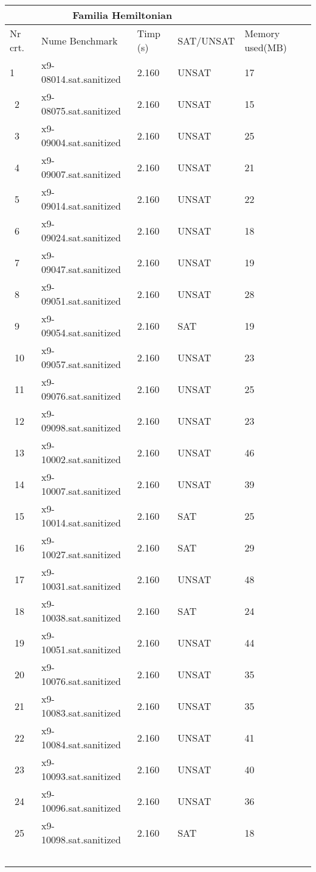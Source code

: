 \documentclass[12pt,a4paper]{report}
\begin{document}
\begin{tabular}{ |p{1cm}||p{4cm}|p{3cm}|p{3cm}|p{3cm}|  }
 \hline
 \multicolumn{4}{|c|}{Familia Hemiltonian} \\
 \hline
 Nr crt.& Nume Benchmark & Timp (s)& SAT/UNSAT & Memory used(MB)\\
 \hline

1 & x9-08014.sat.sanitized &2.160& UNSAT & 17\\\  
2 & x9-08075.sat.sanitized &2.160& UNSAT & 15\\\  
3 & x9-09004.sat.sanitized &2.160& UNSAT & 25\\\  
4 & x9-09007.sat.sanitized &2.160& UNSAT & 21\\\  
5 & x9-09014.sat.sanitized &2.160& UNSAT & 22\\\  
6 & x9-09024.sat.sanitized &2.160& UNSAT & 18\\\  
7 & x9-09047.sat.sanitized &2.160& UNSAT & 19\\\  
8 & x9-09051.sat.sanitized &2.160& UNSAT & 28\\\  
9 & x9-09054.sat.sanitized &2.160& SAT & 19\\\  
10 & x9-09057.sat.sanitized &2.160& UNSAT & 23\\\  
11 & x9-09076.sat.sanitized &2.160& UNSAT & 25\\\  
12 & x9-09098.sat.sanitized &2.160& UNSAT & 23\\\  
13 & x9-10002.sat.sanitized &2.160& UNSAT & 46\\\  
14 & x9-10007.sat.sanitized &2.160& UNSAT & 39\\\  
15 & x9-10014.sat.sanitized &2.160& SAT & 25\\\  
16 & x9-10027.sat.sanitized &2.160& SAT & 29\\\  
17 & x9-10031.sat.sanitized &2.160& UNSAT & 48\\\  
18 & x9-10038.sat.sanitized &2.160& SAT & 24\\\  
19 & x9-10051.sat.sanitized &2.160& UNSAT & 44\\\  
20 & x9-10076.sat.sanitized &2.160& UNSAT & 35\\\  
21 & x9-10083.sat.sanitized &2.160& UNSAT & 35\\\  
22 & x9-10084.sat.sanitized &2.160& UNSAT & 41\\\  
23 & x9-10093.sat.sanitized &2.160& UNSAT & 40\\\  
24 & x9-10096.sat.sanitized &2.160& UNSAT & 36\\\  
25 & x9-10098.sat.sanitized &2.160& SAT & 18\\\  

\end{tabular}
\end{document}
